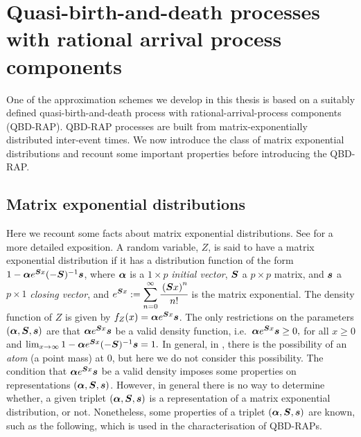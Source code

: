 \section{Quasi-birth-and-death processes with rational arrival process components}\label{qbd-rap intro}
One of the approximation schemes we develop in this thesis is based on a suitably defined quasi-birth-and-death process with rational-arrival-process components (QBD-RAP). QBD-RAP processes are built from matrix-exponentially distributed inter-event times. We now introduce the class of matrix exponential distributions and recount some important properties before introducing the QBD-RAP. 

\subsection{Matrix exponential distributions}
Here we recount some facts about matrix exponential distributions. See \cite{MEinAP} for a more detailed exposition. A random variable, \(Z\), is said to have a matrix exponential distribution if it has a distribution function of the form \(1-\boldsymbol \alpha e^{\boldsymbol Sx}(-\boldsymbol S)^{-1}\boldsymbol s\), where \(\boldsymbol \alpha\) is a \(1\times p\) \emph{initial vector}, \(\boldsymbol S\) a \(p\times p\) matrix, and \(\boldsymbol s\) a \(p\times 1\) \emph{closing vector}, and \(\displaystyle e^{\boldsymbol S x} := \sum_{n=0}^\infty \cfrac{\left(\boldsymbol Sx\right)^n}{n!}\) is the matrix exponential. The density function of \(Z\) is given by \(f_Z(x) = \boldsymbol\alpha e^{\boldsymbol S x}\boldsymbol s\). The only restrictions on the parameters \((\boldsymbol \alpha, \boldsymbol S, \boldsymbol s)\) are that \(\boldsymbol \alpha e^{\boldsymbol S x} \boldsymbol s\) be a valid density function, i.e.~\(\boldsymbol \alpha e^{\boldsymbol S x} \boldsymbol s\geq 0,\) for all \(x\geq 0\) and \(\lim_{x\to\infty} 1-\boldsymbol \alpha e^{\boldsymbol Sx}(-\boldsymbol S)^{-1}\boldsymbol s = 1.\) In general, in \cite{MEinAP}, there is the possibility of an \emph{atom} (a point mass) at 0, but here we do not consider this possibility. The condition that \(\boldsymbol \alpha e^{\boldsymbol Sx}\boldsymbol s\) be a valid density imposes some properties on representations \((\boldsymbol \alpha, \boldsymbol S, \boldsymbol s)\). However, in general there is no way to determine whether, a given triplet \((\boldsymbol \alpha, \boldsymbol S, \boldsymbol s)\) is a representation of a matrix exponential distribution, or not. Nonetheless, some properties of a triplet \((\boldsymbol \alpha, \boldsymbol S, \boldsymbol s)\) are known, such as the following, which is used in the characterisation of QBD-RAPs. 
